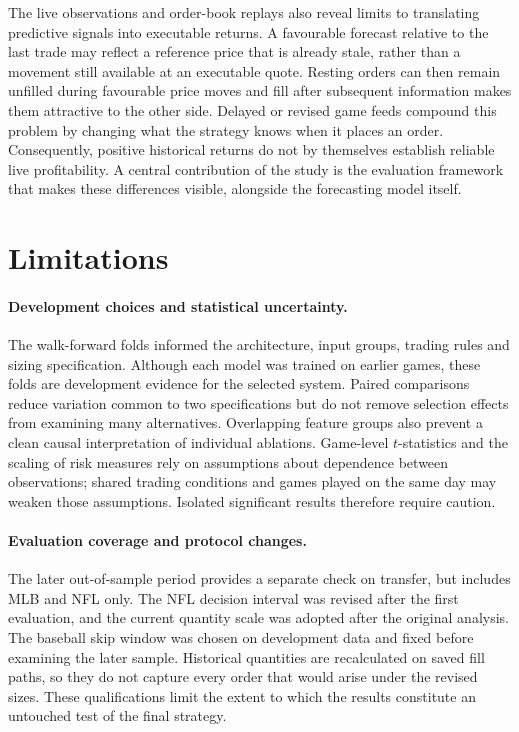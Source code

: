 \documentclass[12pt,a4paper,oneside]{report}
\begin{document}
The live observations and order-book replays also reveal limits to translating
predictive signals into executable returns.
A favourable forecast relative to the last trade may reflect a reference
price that is already stale, rather than a movement still available at an
executable quote. Resting orders can then remain unfilled during favourable
price moves and fill after subsequent information makes them attractive to
the other side. Delayed or revised game feeds compound this problem by
changing what the strategy knows when it places an order. Consequently,
positive historical returns do not by themselves establish reliable live
profitability. A central contribution of the study is the evaluation framework
that makes these differences visible, alongside the forecasting model itself.

\section{Limitations}
\paragraph{Development choices and statistical uncertainty.}
The walk-forward folds informed the architecture, input groups, trading rules
and sizing specification. Although each model was trained on earlier games,
these folds are development evidence for the selected system. Paired
comparisons reduce variation common to two specifications but do not remove
selection effects from examining many alternatives. Overlapping feature groups
also prevent a clean causal interpretation of individual ablations. Game-level
$t$-statistics and the scaling of risk measures rely on assumptions about
dependence between observations; shared trading conditions and games played
on the same day may weaken those assumptions. Isolated significant results
therefore require caution.

\paragraph{Evaluation coverage and protocol changes.}
The later out-of-sample period provides a separate check on transfer, but
includes MLB and NFL only. The NFL decision interval was revised after the
first evaluation, and the current quantity scale was adopted after the
original analysis. The baseball skip window was chosen on development data
and fixed before examining the later sample. Historical quantities are
recalculated on saved fill paths, so they do not capture every order that
would arise under the revised sizes. These qualifications limit the extent
to which the results constitute an untouched test of the final strategy.
\end{document}
